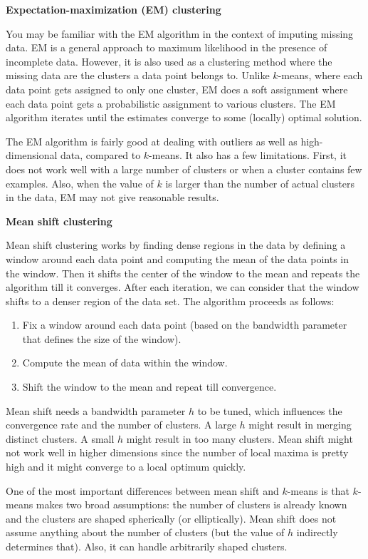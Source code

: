 \documentclass[]{krantz}
\begin{document}
\textbf{Expectation-maximization (EM) clustering}

You may be familiar with the EM algorithm in the context of imputing
missing data. EM is a general approach to maximum likelihood in the
presence of incomplete data. However, it is also used as a clustering
method where the missing data are the clusters a data point belongs to.
Unlike \(k\)-means, where each data point gets assigned to only one
cluster, EM does a soft assignment where each data point gets a
probabilistic assignment to various clusters. The EM algorithm iterates
until the estimates converge to some (locally) optimal solution.

The EM algorithm is fairly good at dealing with outliers as well as
high-dimensional data, compared to \(k\)-means. It also has a few
limitations. First, it does not work well with a large number of
clusters or when a cluster contains few examples. Also, when the value
of \(k\) is larger than the number of actual clusters in the data, EM
may not give reasonable results.

\textbf{Mean shift clustering}

Mean shift clustering works by finding dense regions in the data by
defining a window around each data point and computing the mean of the
data points in the window. Then it shifts the center of the window to
the mean and repeats the algorithm till it converges. After each
iteration, we can consider that the window shifts to a denser region of
the data set. The algorithm proceeds as follows:

\begin{enumerate}
\def\labelenumi{\arabic{enumi}.}
\item
  Fix a window around each data point (based on the bandwidth parameter
  that defines the size of the window).
\item
  Compute the mean of data within the window.
\item
  Shift the window to the mean and repeat till convergence.
\end{enumerate}

Mean shift needs a bandwidth parameter \(h\) to be tuned, which
influences the convergence rate and the number of clusters. A large
\(h\) might result in merging distinct clusters. A small \(h\) might
result in too many clusters. Mean shift might not work well in higher
dimensions since the number of local maxima is pretty high and it might
converge to a local optimum quickly.

One of the most important differences between mean shift and \(k\)-means
is that \(k\)-means makes two broad assumptions: the number of clusters
is already known and the clusters are shaped spherically (or
elliptically). Mean shift does not assume anything about the number of
clusters (but the value of \(h\) indirectly determines that). Also, it
can handle arbitrarily shaped clusters.
\end{document}
